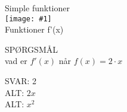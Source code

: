 \documentclass[]{article}
\newenvironment{question}[2]{SPØRGSMÅL\\}{\hspace{50px}}
\newcommand{\name}[1]{{\huge #1}\\}
\newcommand{\tag}[1]{#1}
\newcommand{\cover}[1]{\texttt{[image: \#1]}\\}
\newcommand{\image}[1]{\texttt{[image: \#1]}\\}
\newcommand{\answer}[1]{{\color{green} SVAR: #1}\\}
\newcommand{\alt}[1]{{\color{red} ALT: #1}\\}
\begin{document}
\name{Simple funktioner}
\cover{test.png}
\tag{Funktioner}
\tag{f'(x)}

\begin{question}{multi}

Hvad er $f'(x)$ når $f(x)=2\cdot x$


\answer{2}
\alt{$2x$}
\alt{$x^2$}

\end{question}
\end{document}
